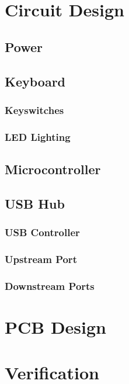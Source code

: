\documentclass[10pt]{report}
\begin{document}
\chapter{Circuit Design}

\section{Power}

\section{Keyboard}

\subsection{Keyswitches}

\subsection{LED Lighting}

\section{Microcontroller}

\section{USB Hub}

\subsection{USB Controller}

\subsection{Upstream Port}

\subsection{Downstream Ports}

\chapter{PCB Design}

\chapter{Verification}
\end{document}
